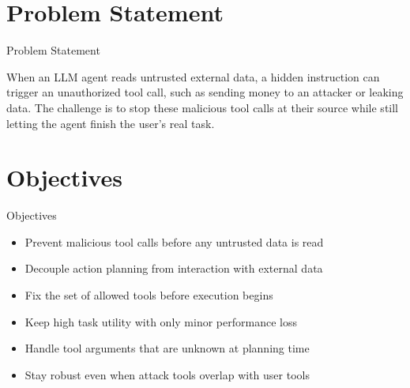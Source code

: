 \documentclass[10pt]{beamer}
\begin{document}
\section{Problem Statement}
\begin{frame}{Problem Statement}
  \begin{block}{}
  When an LLM agent reads untrusted external data, a hidden instruction can trigger an unauthorized tool call, such as sending money to an attacker or leaking data. The challenge is to stop these malicious tool calls at their source while still letting the agent finish the user's real task.
  \end{block}
\end{frame}
\section{Objectives}
\begin{frame}{Objectives}
\begin{itemize}
  \item Prevent malicious tool calls before any untrusted data is read
  \item Decouple action planning from interaction with external data
  \item Fix the set of allowed tools before execution begins
  \item Keep high task utility with only minor performance loss
  \item Handle tool arguments that are unknown at planning time
  \item Stay robust even when attack tools overlap with user tools
\end{itemize}
\end{frame}
\end{document}
